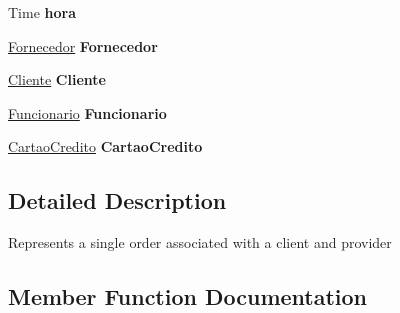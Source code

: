 \begin{DoxyCompactItemize}
\item 
\mbox{\label{classmvc_j_j_m_s_1_1_models_1_1_encomenda_aab20d50f65941cc14f8f788df81b38f4}} 
Time {\bfseries hora}
\item 
\mbox{\label{classmvc_j_j_m_s_1_1_models_1_1_encomenda_abd1d537103768bd2fd04fb101d619cff}} 
\mbox{\hyperlink{classmvc_j_j_m_s_1_1_models_1_1_fornecedor}{Fornecedor}} {\bfseries Fornecedor}
\item 
\mbox{\label{classmvc_j_j_m_s_1_1_models_1_1_encomenda_aece29e51f47f22335c4389cd93681762}} 
\mbox{\hyperlink{classmvc_j_j_m_s_1_1_models_1_1_cliente}{Cliente}} {\bfseries Cliente}
\item 
\mbox{\label{classmvc_j_j_m_s_1_1_models_1_1_encomenda_a1ec41ea5da756970ca724b380fd5c1d6}} 
\mbox{\hyperlink{classmvc_j_j_m_s_1_1_models_1_1_funcionario}{Funcionario}} {\bfseries Funcionario}
\item 
\mbox{\label{classmvc_j_j_m_s_1_1_models_1_1_encomenda_ae31a8102edef2266a82825502dc97c02}} 
\mbox{\hyperlink{classmvc_j_j_m_s_1_1_models_1_1_cartao_credito}{Cartao\+Credito}} {\bfseries Cartao\+Credito}
\end{DoxyCompactItemize}


\subsection{Detailed Description}
Represents a single order associated with a client and provider 



\subsection{Member Function Documentation}
\mbox{\label{classmvc_j_j_m_s_1_1_models_1_1_encomenda_ad9b0bcfd5eba91703a412e5fd30718e0}} 
